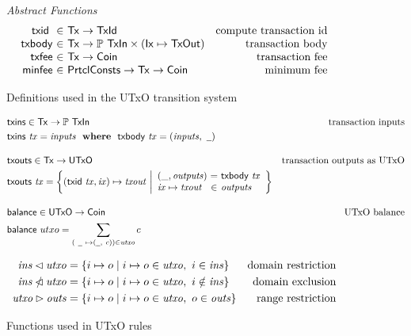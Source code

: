 \documentclass[11pt,a4paper]{article}
\newcommand{\Tx}{\type{Tx}}
\newcommand{\Ix}{\type{Ix}}
\newcommand{\TxId}{\type{TxId}}
\newcommand{\UTxO}{\type{UTxO}}
\newcommand{\Coin}{\type{Coin}}
\newcommand{\PrtclConsts}{\type{PrtclConsts}}
\newcommand{\TxIn}{\type{TxIn}}
\newcommand{\TxOut}{\type{TxOut}}
\newcommand{\txins}[1]{\fun{txins}~ \var{#1}}
\newcommand{\txid}[1]{\fun{txid}~ \var{#1}}
\newcommand{\txbody}[1]{\fun{txbody}~ \var{#1}}
\newcommand{\wcard}[0]{\underline{\phantom{a}}}
\begin{document}
\begin{figure*}
\begin{equation*}
  \end{equation*}
  \emph{Abstract Functions}
  \begin{equation*}
    \begin{array}{r@{~\in~}lr}
      \txid{} & \Tx \to \TxId & \text{compute transaction id}\\
      \fun{txbody} & \Tx \to \powerset{\TxIn} \times (\Ix \mapsto \TxOut)
                                  & \text{transaction body}\\
      \fun{txfee} & \Tx \to \Coin & \text{transaction fee}\\
      \fun{minfee} & \PrtclConsts \to \Tx \to \Coin & \text{minimum fee}
    \end{array}
  \end{equation*}
  \caption{Definitions used in the UTxO transition system}
  \label{fig:defs:utxo}
\end{figure*}

\begin{figure}
  \begin{align*}
    & \fun{txins} \in \Tx \to \powerset{\TxIn}
    & \text{transaction inputs} \\
    & \txins{tx} = \var{inputs} \where \txbody{tx} = (\var{inputs}, ~\wcard)
    \nextdef
    & \fun{txouts} \in \Tx \to \UTxO
    & \text{transaction outputs as UTxO} \\
    & \fun{txouts} ~ \var{tx} =
      \left\{ (\fun{txid} ~ \var{tx}, \var{ix}) \mapsto \var{txout} ~
      \middle| \begin{array}{l@{~}c@{~}l}
                 (\_, \var{outputs}) & = & \txbody{tx} \\
                 \var{ix} \mapsto \var{txout} & \in & \var{outputs}
               \end{array}
      \right\}
    \nextdef
    & \fun{balance} \in \UTxO \to \Coin
    & \text{UTxO balance} \\
    & \fun{balance} ~ utxo = \sum_{(~\wcard ~ \mapsto (\wcard, ~c)) \in \var{utxo}} c
  \end{align*}

  \begin{align*}
    \mathit{ins} \lhd \mathit{utxo}
    & = \{ i \mapsto o \mid i \mapsto o \in \mathit{utxo}, ~ i \in \mathit{ins} \}
    & \text{domain restriction}
    \\
    \mathit{ins} \mathbin{\slashed{\lhd}} \mathit{utxo}
    & = \{ i \mapsto o \mid i \mapsto o \in \mathit{utxo}, ~ i \notin \mathit{ins} \}
    & \text{domain exclusion}
    \\
    \mathit{utxo} \rhd \mathit{outs}
    & = \{ i \mapsto o \mid i \mapsto o \in \mathit{utxo}, ~ o \in \mathit{outs} \}
    & \text{range restriction}
  \end{align*}
  \caption{Functions used in UTxO rules}
  \label{fig:derived-defs:utxo}
\end{figure}
\end{document}
